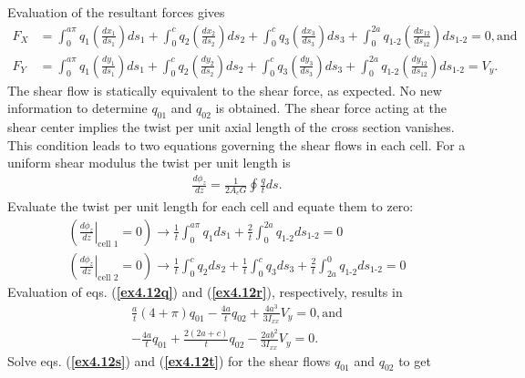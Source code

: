 \documentclass{AeroStructure-ERJohnson}
\begin{document}
\begin{example}
\noindent Evaluation of the resultant forces gives
\begin{align}
F_{X} &=\int_{0}^{a \pi} q_{1}\left(\frac{d x_{1}}{d s_{1}}\right) d s_{1}+\int_{0}^{c} q_{2}\left(\frac{d x_{2}}{d s_{2}}\right) d s_{2}+\int_{0}^{c} q_{3}\left(\frac{d x_{3}}{d s_{3}}\right) d s_{3}+\int_{0}^{2a} q_{\textrm{1-2}}\left(\frac{d x_{12}}{d s_{12}}\right) d s_{\textrm{1-2}}=0, \text{and}\label{ex4.12n}
\\
F_{Y} &=\int_{0}^{a \pi} q_{1}\left(\frac{d y_{1}}{d s_{1}}\right) d s_{1}+\int_{0}^{c} q_{2}\left(\frac{d y_{2}}{d s_{2}}\right) d s_{2}+\int_{0}^{c} q_{3}\left(\frac{d y_{3}}{d s_{3}}\right) d s_{3}+\int_{0}^{2a} q_{\textrm{1-2}}\left(\frac{d y_{12}}{d s_{12}}\right) d s_{\textrm{1-2}}=V_{y}.\label{ex4.12o}
\end{align}
The shear flow is statically equivalent to the shear force, as expected. No new information to determine $q_{01}$ and $q_{02}$ is obtained. The shear force acting at the shear center implies the twist per unit axial length of the cross section vanishes. This condition leads to two equations governing the shear flows in each cell. For a uniform shear modulus the twist per unit length is
\begin{align}\label{ex4.12p}
\frac{d \phi_{z}}{d z}=\frac{1}{2 A_{c} G} \oint\! \frac{q}{t} d s.
\end{align}
Evaluate the twist per unit length for each cell and equate them to zero:
\begin{gather}\label{ex4.12q}
\left(\left.\frac{d \phi_{z}}{d z}\right|_{\textrm{cell } 1}=0\right) \rightarrow \frac{1}{t} \int_{0}^{a \pi} q_{1} d s_{1}+\frac{2}{t} \int_{0}^{2a} q_{\textrm{1-2}} d s_{\textrm{1-2}}=0
\\
\left(\left.\frac{{d} \phi_{z}}{{d} z}\right|_{\textrm{cell } 2}=0\right) \rightarrow \frac{1}{t} \int_{0}^{c} q_{2} d s_{2}+\frac{1}{t} \int_{0}^{c} q_{3} d s_{3}+\frac{2}{t} \int_{2 a}^{0} q_{\textrm{1-2}} d s_{\textrm{1-2}}=0\label{ex4.12r}
\end{gather}
Evaluation of eqs. (\textbf{\ref{ex4.12q}}) and (\textbf{\ref{ex4.12r}}), respectively, results in
\begin{gather}
\frac{a}{t}(4+\pi) q_{01}-\frac{4 a}{t} q_{02}+\frac{4 a^{3}}{3 I_{x x}} V_{y}=0, \text{and}\label{ex4.12s}\\
-\frac{4 a}{t} q_{01}+\frac{2(2 a+c)}{t} q_{02}-\frac{2 a b^{2}}{3 I_{x x}} V_{y}=0.\label{ex4.12t}
\end{gather}
Solve eqs. (\textbf{\ref{ex4.12s}}) and (\textbf{\ref{ex4.12t}}) for the shear flows $q_{01}$ and $q_{02}$ to get

\end{example}
\end{document}
